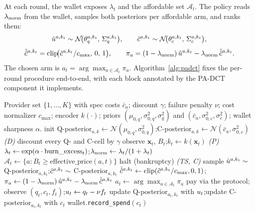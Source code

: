 At each round, the wallet exposes $\lambda_t$ and the affordable set $\mathcal{A}_t$. The policy reads $\lambda_{\mathrm{norm}}$ from the wallet, samples both posteriors per affordable arm, and ranks them:
\begin{equation}
\label{eq:padct-sample}
\hat u^{a,k_t} \sim \mathcal{N}\!\big(\theta_q^{a,k_t},\, \Sigma_q^{a,k_t}\big), \qquad
\hat c^{a,k_t} \sim \mathcal{N}\!\big(\theta_c^{a,k_t},\, \Sigma_c^{a,k_t}\big),
\end{equation}
\begin{equation}
\label{eq:padct-score}
\tilde{\hat c}^{a,k_t} = \mathrm{clip}\!\big(\hat c^{a,k_t}/c_{\max},\, 0,\, 1\big), \qquad
\pi_a = (1 - \lambda_{\mathrm{norm}})\,\hat u^{a,k_t} - \lambda_{\mathrm{norm}}\,\tilde{\hat c}^{a,k_t}.
\end{equation}
The chosen arm is $a_t = \arg\max_{a \in \mathcal{A}_t} \pi_a$. Algorithm~\ref{alg:padct} fixes the per-round procedure end-to-end, with each block annotated by the PA-DCT component it implements.

\begin{algorithm}[t]
\caption{\padct{} (Payment-Aware Discounted Contextual Thompson sampling). Block annotations P, D, C, TS mark the four ablatable components.}
\label{alg:padct}
\begin{algorithmic}[1]
\Require Provider set $\{1,\ldots,K\}$ with spec costs $\bar c_a$; discount $\gamma$; failure penalty $\nu$; cost normalizer $c_{\max}$; encoder $k(\cdot)$; priors $(\mu_{0,q}, \sigma^2_{0,q}, \sigma^2_q)$ and $(\bar c_a, \sigma^2_{0,c}, \sigma^2_c)$; wallet sharpness $\alpha$.
  \State init Q-posterior$_{a,k} \leftarrow \mathcal{N}(\mu_{0,q}, \sigma^2_{0,q})$;\quad C-posterior$_{a,k} \leftarrow \mathcal{N}(\bar c_a, \sigma^2_{0,c})$
\EndFor
{}
  \State \emph{(D)} discount every Q- and C-cell by $\gamma$
  \State observe $\mathbf{x}_t$, $B_t$;\quad $k_t \leftarrow k(\mathbf{x}_t)$
  \State \emph{(P)} $\lambda_t \leftarrow \exp(\alpha \cdot \mathrm{burn\_excess}_t)$;\quad $\lambda_{\mathrm{norm}} \leftarrow \lambda_t / (1 + \lambda_t)$
  \State $\mathcal{A}_t \leftarrow \{a : B_t \geq \mathrm{effective\_price}(a, t)\}$
   halt (bankruptcy) \EndIf
    \State \emph{(TS, C)} sample $\hat u^{a,k_t} \sim$ Q-posterior$_{a, k_t}$;\quad $\hat c^{a,k_t} \sim$ C-posterior$_{a, k_t}$
    \State $\tilde{\hat c}^{a,k_t} \leftarrow \mathrm{clip}(\hat c^{a,k_t}/c_{\max}, 0, 1)$;\quad $\pi_a \leftarrow (1-\lambda_{\mathrm{norm}})\,\hat u^{a,k_t} - \lambda_{\mathrm{norm}}\,\tilde{\hat c}^{a,k_t}$
  \EndFor
  \State $a_t \leftarrow \arg\max_{a \in \mathcal{A}_t} \pi_a$
  \State pay via the protocol; observe $(q_t, c_t, f_t)$;\quad $u_t \leftarrow q_t - \nu f_t$
  \State update Q-posterior$_{a_t, k_t}$ with $u_t$;\quad update C-posterior$_{a_t, k_t}$ with $c_t$
  \State wallet.\texttt{record\_spend}$(c_t)$
\EndFor
\end{algorithmic}
\end{algorithm}

